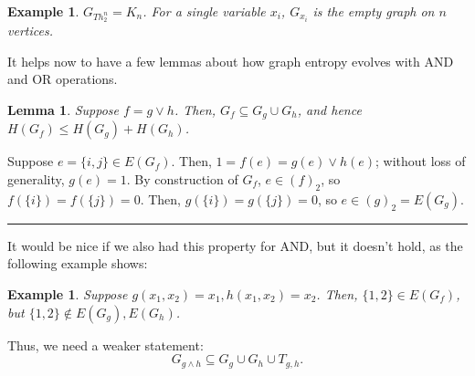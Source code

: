 \documentclass[twoside]{article}
\newcounter{tnum}
\newtheorem{lemma}[tnum]{Lemma}
\newtheorem{example}[tnum]{Example}
\newenvironment{proof}{{\bf Proof:}}{\hfill\rule{2mm}{2mm}}
\begin{document}
\begin{example}
\normalfont
$G_{Th_2^n} = K_n$.
For a single variable $x_i$, $G_{x_i}$ is the empty graph on $n$ vertices.
\end{example}

\newpage
It helps now to have a few lemmas about how graph entropy evolves with AND and
OR operations.

\begin{lemma}
Suppose $f = g \vee h$. Then, $G_f \subseteq G_g \cup G_h$, and hence
$H(G_f) \leq H(G_g) + H(G_h)$.
\label{l:1}
\end{lemma}
\vspace{-0.15in}
\begin{proof}
Suppose $e = \{i,j\} \in E(G_f)$. Then, $1 = f(e) = g(e) \vee h(e)$; without
loss of generality, $g(e) = 1$. By construction of $G_f$, $e \in (f)_2$, so
$f(\{i\}) = f(\{j\}) = 0$. Then, $g(\{i\}) = g(\{j\}) = 0$, so
$e \in (g)_2 = E(G_g)$.
\end{proof}

It would be nice if we also had this property for AND, but it doesn't hold, as
the following example shows:

\begin{example}
\normalfont
Suppose $g(x_1,x_2) = x_1, h(x_1,x_2) = x_2$.
Then, $\{1,2\} \in E(G_f)$, but $\{1,2\} \notin E(G_g), E(G_h)$.
\end{example}

Thus, we need a weaker statement:
\[G_{g \wedge h} \subseteq G_g \cup G_h \cup T_{g,h}.\]
\end{document}
